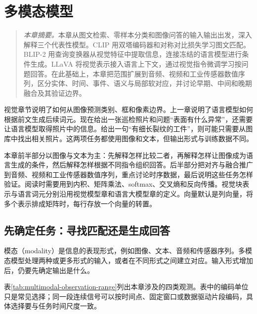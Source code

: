 \chapter{多模态模型}
\begin{quote}\small
\textit{本章摘要。}本章从图文检索、零样本分类和图像问答的输入输出出发，深入解释三个代表性模型。CLIP 用双塔编码器和对称对比损失学习图文匹配。\mbox{BLIP-2} 用查询变换器从视觉特征中提取信息，连接冻结的语言模型进行条件生成。LLaVA 将视觉表示接入语言上下文，通过视觉指令微调学习按问题回答。在此基础上，本章把范围扩展到音频、视频和工业传感器数值序列，区分实体、时间、事件、语义与局部软对应，并讨论早期、中间和晚期融合及其验证边界。
\end{quote}
视觉章节说明了如何从图像预测类别、框和像素边界。上一章说明了语言模型如何根据前文生成后续词元。现在给出一张巡检照片和问题“表面有什么异常”，还需要让语言模型取得照片中的信息。给出一句“有细长裂纹的工件”，则可能只需要从图库中找出相关照片。这两项任务都使用图像和文本，但输出形式与训练数据不同。

本章前半部分以图像与文本为主：先解释怎样比较二者，再解释怎样让图像成为语言生成的条件，然后解释怎样根据不同指令组织回答。后半部分把对齐与融合推广到音频、视频和工业传感器数值序列，重点讨论时序数据，最后说明这些任务怎样验证。阅读时需要用到内积、矩阵乘法、softmax、交叉熵和反向传播。视觉块表示与语言词元分别沿用视觉模型章和语言大模型章的定义。向量默认是列向量，将多个表示排成矩阵时，每行存放一个向量的转置。

\section{先确定任务：寻找匹配还是生成回答}
模态（modality）是信息的表现形式，例如图像、文本、音频和传感器序列。多模态模型处理两种或更多形式的输入，或者在不同形式之间建立对应。输入形式增加后，仍要先确定输出是什么。

表\ref{tab:multimodal-observation-range}列出本章涉及的四类观测。表中的编码单位只是常见选择；同一段连续信号可以按时间点、固定窗口或数据驱动片段编码，具体选择要与任务时间尺度一致。

